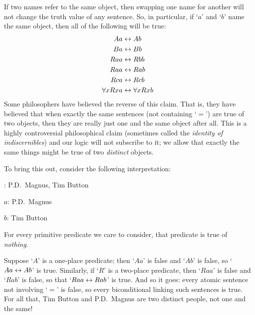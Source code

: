 If two names refer to the same object, then swapping one name for another will not change the truth value of any sentence. So, in particular, if `$a$' and `$b$' name the same object, then all of the following will be true:\label{model.nonidentity}
	\begin{align*}
	 	Aa &\leftrightarrow Ab \\
	 	Ba &\leftrightarrow Bb\\
		Raa &\leftrightarrow Rbb\\
		Raa & \leftrightarrow Rab\\
		Rca &\leftrightarrow Rcb\\
		\forall x Rxa &\leftrightarrow \forall x Rxb
	\end{align*}
Some philosophers have believed the reverse of this claim. That is, they have believed that when exactly the same sentences (not containing `$=$') are true of two objects, then they are really just one and the same object after all. This is a highly controversial philosophical claim (sometimes called the \emph{identity of indiscernibles}) and our logic will not subscribe to it; we allow that exactly the same things might be true of two \emph{distinct} objects.  

To bring this out, consider the following interpretation:
	\begin{ebullet}
		\item[\text{domain}:] P.D.\ Magnus, Tim Button
		\item[$a$:] P.D.\ Magnus
		\item[$b$:] Tim Button
		\item For every primitive predicate we care to consider, that predicate is true of \emph{nothing}.
	\end{ebullet}
Suppose `$A$' is a one-place predicate; then `$Aa$' is false and `$Ab$' is false, so `$Aa \leftrightarrow Ab$' is true. Similarly, if `$R$' is a two-place predicate, then `$Raa$' is false and `$Rab$' is false, so that `$Raa \leftrightarrow Rab$' is true. And so it goes: every atomic sentence not involving `$=$' is false, so every biconditional linking such sentences is true. For all that, Tim Button and P.D.\ Magnus are two distinct people, not one and the same!

